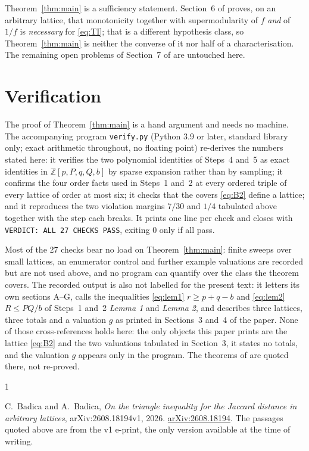 \documentclass[11pt]{amsart}
\theoremstyle{remark}
\begin{document}
Theorem~\ref{thm:main} is a sufficiency statement. Section~6 of \cite{BB}
proves, on an arbitrary lattice, that monotonicity together with
supermodularity of $f$ \emph{and} of $1/f$ is \emph{necessary} for
\eqref{eq:TI}; that is a different hypothesis class, so
Theorem~\ref{thm:main} is neither the converse of it nor half of a
characterisation. The remaining open problems of Section~7 of \cite{BB} are
untouched here.

\section{Verification}\label{sec:verify}

The proof of Theorem~\ref{thm:main} is a hand argument and needs no machine.
The accompanying program \texttt{verify.py} (Python 3.9 or later, standard
library only; exact arithmetic throughout, no floating point) re-derives the
numbers stated here: it verifies the two polynomial identities of Steps~4
and~5 as exact identities in $\mathbb{Z}[p,P,q,Q,b]$ by sparse expansion
rather than by sampling; it confirms the four order facts used in Steps~1
and~2 at every ordered triple of every lattice of order at most six; it checks
that the covers \eqref{eq:B2} define a lattice; and it reproduces the two
violation margins $7/30$ and $1/4$ tabulated above together with the step each
breaks. It prints one line per check and closes with
\texttt{VERDICT: ALL 27 CHECKS PASS}, exiting $0$ only if all pass.

Most of the 27 checks bear no load on Theorem~\ref{thm:main}: finite sweeps
over small lattices, an enumerator control and further example valuations are
recorded but are not used above, and no program can quantify over the class the
theorem covers. The recorded output is also not labelled for the present text:
it letters its own sections A--G, calls the inequalities \eqref{eq:lem1}
$r\ge p+q-b$ and \eqref{eq:lem2} $R\le PQ/b$ of Steps~1 and~2 \emph{Lemma 1}
and \emph{Lemma 2}, and describes three lattices, three totals and a valuation
$g$ as printed in Sections~3 and~4 of the paper. None of those cross-references
holds here: the only objects this paper prints are the lattice \eqref{eq:B2}
and the two valuations tabulated in Section~3, it states no totals, and the
valuation $g$ appears only in the program. The theorems of \cite{BB} are quoted
there, not re-proved.

\begin{thebibliography}{1}

C.~Badica and A.~Badica,
\emph{On the triangle inequality for the Jaccard distance in arbitrary
lattices},
arXiv:2608.18194v1, 2026.
\href{https://arxiv.org/abs/2608.18194}{arXiv:2608.18194}.
The passages quoted above are from the v1 e-print, the only version available
at the time of writing.

\end{thebibliography}
\end{document}
